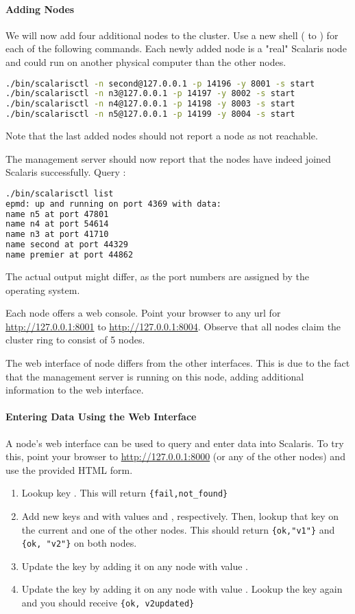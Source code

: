 \paragraph{Adding Nodes}
\label{par:AddingNodes}

We will now add four additional nodes to the cluster. Use a new shell
( to ) for each of the following commands. Each newly added node is a
"real" Scalaris node and could run on another physical computer than the other nodes.
\begin{lstlisting}[language=sh]
./bin/scalarisctl -n second@127.0.0.1 -p 14196 -y 8001 -s start
./bin/scalarisctl -n n3@127.0.0.1 -p 14197 -y 8002 -s start
./bin/scalarisctl -n n4@127.0.0.1 -p 14198 -y 8003 -s start
./bin/scalarisctl -n n5@127.0.0.1 -p 14199 -y 8004 -s start
\end{lstlisting}
Note that the last added nodes should not report a node as not reachable.

The management server should now report that the nodes have indeed joined Scalaris
successfully. Query :
\begin{lstlisting}[language=sh]
./bin/scalarisctl list
epmd: up and running on port 4369 with data:
name n5 at port 47801
name n4 at port 54614
name n3 at port 41710
name second at port 44329
name premier at port 44862
\end{lstlisting}
The actual output might differ, as the port numbers are assigned by the operating system.

Each node offers a web console. Point your browser to any url for
\url{http://127.0.0.1:8001} to \url{http://127.0.0.1:8004}.
Observe that all nodes claim the cluster ring to consist of 5 nodes.

The web interface of node  differs from the other interfaces. This is due to
the fact that the management server is running on this node, adding additional information
to the web interface.

\paragraph{Entering Data Using the Web Interface}
A node's web interface can be used to query and enter data into Scalaris. To try this,
point your browser to \url{http://127.0.0.1:8000} (or any of the other nodes) and use
the provided HTML form.

\begin{enumerate}
    \item Lookup key . This will return \lstinline|{fail,not_found}|
    \item Add new keys  and  with values  and ,
    respectively. Then, lookup that key on
    the current and one of the other nodes. This should return \lstinline|{ok,"v1"}| and
    \lstinline|{ok, "v2"}| on both nodes.
    \item Update the key  by adding it on any node with value .
    \item Update the key  by adding it on any node with value .
    Lookup the key again and you should receive \lstinline|{ok, v2updated}|
\end{enumerate}

